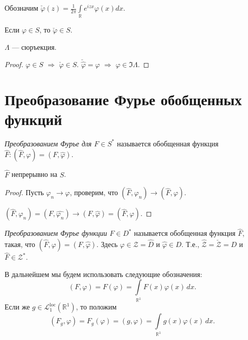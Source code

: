 \documentclass[10pt]{article}
\begin{document}
Обозначим $\check \varphi(z)=
\frac{1}{2\pi}\int\limits_{\mathbb{R}}e^{izx}\varphi(x)dx$.

\begin{prop}
Если $\varphi\in S$, то $\check\varphi\in S$.
\end{prop}

\begin{prop}
$\Lambda$ --- сюръекция.
\end{prop}

\begin{proof}
$\varphi\in S$ $\Rightarrow$ $\check\varphi\in S$.
$\check{\hat\varphi}=\varphi$ $\Rightarrow$ $\varphi\in \Im
\Lambda$.
\end{proof}

\section{Преобразование Фурье обобщенных функций}

\begin{df}
\emph{Преобразованием Фурье для $F\in S^*$} называется обобщенная
функция $\hat F : (\hat F,\varphi)=(F,\hat\varphi)$.
\end{df}

\begin{prop}
$\hat F$ непрерывно на $S$.
\end{prop}

\begin{proof}
Пусть $\varphi_n\rightarrow\varphi$, проверим, что $(\hat
F,\varphi_n)\rightarrow (\hat F,\varphi)$.

$(\hat F,\varphi_n)=(F,\widehat{\varphi_n})\rightarrow
(F,\hat\varphi)=(\hat F,\varphi)$.
\end{proof}



\begin{df}
\emph{Преобразованием Фурье функции $F\in D^*$} называется
обобщенная функция $\hat{F}$, такая, что
$(\hat{F},\varphi)=(F,\hat{\varphi})$. Здесь $\varphi\in
\mathcal{Z}=\hat{D}$ и $\hat{\varphi}\in D$. Т.е.,
$\hat{\mathcal{Z}}=\check{\mathcal{Z}}=D$ и
$\hat{F}\in\mathcal{Z}^*$.
\end{df}

В дальнейшем мы будем использовать следующие обозначения:
$$(F,\varphi)=F(\varphi)=\int\limits_{\mathbb{R}^1}\!F(x)\varphi(x)\,dx.$$
Если же $g\in\mathcal{L}^{\mathrm{loc}}_1(\mathbb{R}^1)$, то положим
$$(F_g,\varphi)=F_g(\varphi)=(g,\varphi)=\int\limits_{\mathbb{R}^1}\!g(x)\varphi(x)\,dx.$$
\end{document}
